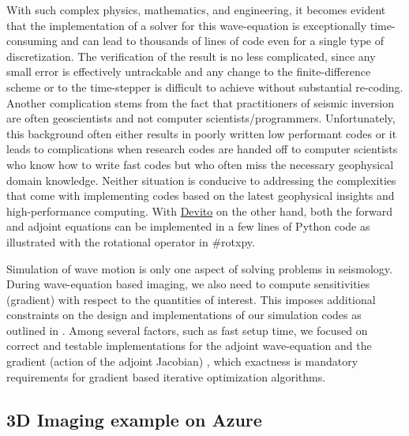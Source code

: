 \documentclass[conference]{IEEEtran}
\begin{document}
With such complex physics, mathematics, and engineering, it becomes
evident that the implementation of a solver for this wave-equation is
exceptionally time-consuming and can lead to thousands of lines of code
even for a single type of discretization. The verification of the result
is no less complicated, since any small error is effectively untrackable
and any change to the finite-difference scheme or to the time-stepper is
difficult to achieve without substantial re-coding. Another complication
stems from the fact that practitioners of seismic inversion are often
geoscientists and not computer scientists/programmers. Unfortunately,
this background often either results in poorly written low performant
codes or it leads to complications when research codes are handed off to
computer scientists who know how to write fast codes but who often miss
the necessary geophysical domain knowledge. Neither situation is
conducive to addressing the complexities that come with implementing
codes based on the latest geophysical insights and high-performance
computing. With \href{https://github.com/devitocodes/devito}{Devito} on
the other hand, both the forward and adjoint equations can be
implemented in a few lines of Python code as illustrated with the
rotational operator in \#rotxpy.

Simulation of wave motion is only one aspect of solving problems in
seismology. During wave-equation based imaging, we also need to compute
sensitivities (gradient) with respect to the quantities of interest.
This imposes additional constraints on the design and implementations of
our simulation codes as outlined in \cite{virieux}. Among several
factors, such as fast setup time, we focused on correct and testable
implementations for the adjoint wave-equation and the gradient (action
of the adjoint Jacobian)
\cite{louboutin2018segeow, louboutin2020THmfi}, which exactness is
mandatory requirements for gradient based iterative optimization
algorithms.

\subsection{3D Imaging example on
Azure}\label{d-imaging-example-on-azure}
\end{document}

